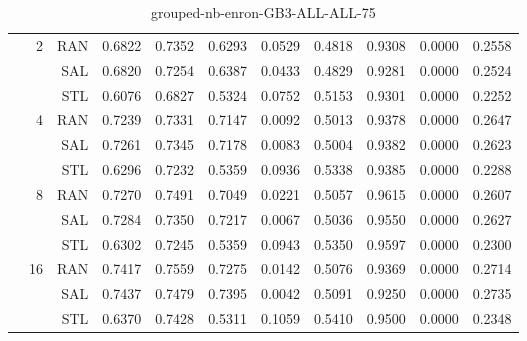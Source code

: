 \begin{center}
\begin{table}[htbp]
\begin{tabular}{ | r | r | r | r | r | r | r | r | r | r | r |}
 & \multirow{3}{*}{2} & RAN & 0.6822 & 0.7352 & 0.6293 & 0.0529 & 0.4818 & 0.9308 & 0.0000 & 0.2558\\ \cline{3-11}
 &   & SAL & 0.6820 & 0.7254 & 0.6387 & 0.0433 & 0.4829 & 0.9281 & 0.0000 & 0.2524\\ \cline{3-11}
 &   & STL & 0.6076 & 0.6827 & 0.5324 & 0.0752 & 0.5153 & 0.9301 & 0.0000 & 0.2252\\ \cline{2-11}
 & \multirow{3}{*}{4} & RAN & 0.7239 & 0.7331 & 0.7147 & 0.0092 & 0.5013 & 0.9378 & 0.0000 & 0.2647\\ \cline{3-11}
 &   & SAL & 0.7261 & 0.7345 & 0.7178 & 0.0083 & 0.5004 & 0.9382 & 0.0000 & 0.2623\\ \cline{3-11}
 &   & STL & 0.6296 & 0.7232 & 0.5359 & 0.0936 & 0.5338 & 0.9385 & 0.0000 & 0.2288\\ \cline{2-11}
 & \multirow{3}{*}{8} & RAN & 0.7270 & 0.7491 & 0.7049 & 0.0221 & 0.5057 & 0.9615 & 0.0000 & 0.2607\\ \cline{3-11}
 &   & SAL & 0.7284 & 0.7350 & 0.7217 & 0.0067 & 0.5036 & 0.9550 & 0.0000 & 0.2627\\ \cline{3-11}
 &   & STL & 0.6302 & 0.7245 & 0.5359 & 0.0943 & 0.5350 & 0.9597 & 0.0000 & 0.2300\\ \cline{2-11}
 & \multirow{3}{*}{16} & RAN & 0.7417 & 0.7559 & 0.7275 & 0.0142 & 0.5076 & 0.9369 & 0.0000 & 0.2714\\ \cline{3-11}
 &   & SAL & 0.7437 & 0.7479 & 0.7395 & 0.0042 & 0.5091 & 0.9250 & 0.0000 & 0.2735\\ \cline{3-11}
 &   & STL & 0.6370 & 0.7428 & 0.5311 & 0.1059 & 0.5410 & 0.9500 & 0.0000 & 0.2348\\ \cline{2-11}
\hline
\end{tabular}
\caption{grouped-nb-enron-GB3-ALL-ALL-75}
\end{table}
\end{center}

